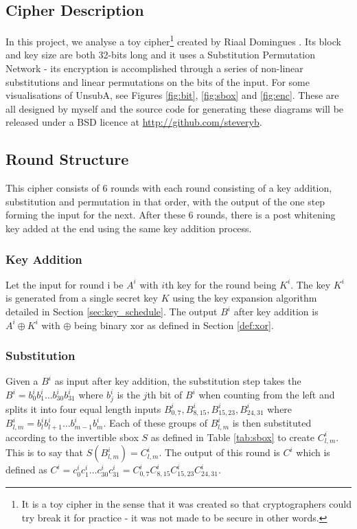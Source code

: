 \documentclass[12pt,a4paper]{article}
\begin{document}
\subsection{Cipher Description}
In this project, we analyse a toy cipher\footnote{It is a toy cipher in the
sense that it
was created so that cryptographers could try break it for practice - it was not
made to be secure in other words.} created by Riaal Domingues \cite{UnSubA}
. Its block and key size are both 32-bits long and it uses a Substitution Permutation
Network - its encryption is accomplished through a series of non-linear substitutions
and linear permutations on the bits of the input. For some visualisations of
UnsubA, see Figures \ref{fig:bit}, \ref{fig:sbox} and \ref{fig:enc}. These are
all designed by myself and the source code for generating these diagrams will
be released under a BSD licence at \url{http://github.com/steveryb}.

\subsection{Round Structure}
This cipher consists of 6 rounds with each round consisting of a key addition, substitution and
permutation in that order, with the output of the one step forming the input
for the next. After these 6 rounds, there is a post whitening key added at the
end using the same key addition process.

\subsubsection{Key Addition}
Let the input for round i be $A^i$ with $i$th key for the round being $K^i$. The
key $K^i$ is generated from a single secret key $K$ using the key expansion
algorithm detailed in Section \ref{sec:key_schedule}. The output $B^i$ after
key addition is $A^i \oplus K^i$ with $\oplus$ being binary xor as defined in
Section \ref{def:xor}.

\subsubsection{Substitution}
Given a $B^i$ as input after key addition, the substitution step takes the
$B^i = b_0^i b_1^i \ldots b_{30}^i b_{31}^i$ where $b_j^i$ is the $j$th bit of
$B^i$ when counting from the left and splits it into four equal length inputs
$B_{0,7}^i,B_{8,15}^i,B_{15,23}^i,B_{24,31}^i$ where $B_{l,m}^i = b_l^i
b_{l+1}^i \ldots b_{m-1}^i b_{m}^i$. Each of these groups of $B_{l,m}^i$
is then substituted according to the invertible sbox $S$ as defined in Table
\ref{tab:sbox} to create $C_{l,m}^i$. This is to say that $S(B_{l,m}^i) =
C_{l,m}^i$. The output of this round is $C^i$ which
is defined as $C^i = c_0^i c_1^i \ldots c_{30}^i c_{31}^i =
C_{0,7}^iC_{8,15}^iC_{15,23}^iC_{24,31}^i$.
\end{document}
